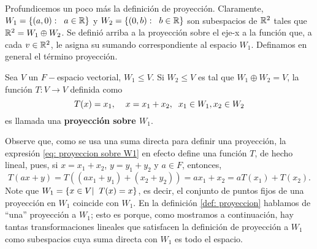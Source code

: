 Profundicemos un poco más la definición de proyección.
Claramente, $W_{1} = \{ (a, 0): \hspace{0.2cm} a \in \mathbb{R} \}$
y $W_{2} = \{ (0, b): \hspace{0.2cm} b \in \mathbb{R} \}$
son subespacios de $\mathbb{R}^{2}$ tales que 
$\mathbb{R}^{2} = W_{1} \oplus W_{2}$. Se definió arriba a la proyección
sobre el eje-x a la función que, a cada $v \in \mathbb{R}^{2}$, le 
asigna su sumando correspondiente al espacio $W_{1}$.
Definamos en general el término proyección.
\begin{defi}
	\label{def: proyeccion}
Sea $V$ un $F-$espacio vectorial, $W_{1} \leq V$.
Si $W_{2} \leq V$ es tal que $W_{1} \oplus W_{2} = V$, 
la función $T: V \longrightarrow V$ definida como
\begin{equation}
	\label{eq: proyeccion sobre W1}
	T(x) = x_{1}, \hspace{0.4cm}
x = x_{1} + x_{2}, \hspace{0.2cm}
x_{1} \in W_{1}, x_{2} \in W_{2}
\end{equation}
es llamada
una \textbf{proyección sobre $W_{1}$}.
\end{defi}
Observe que, como se usa una suma directa para
definir una proyección, la expresión
\eqref{eq: proyeccion sobre W1}
en efecto define una función $T$, de hecho lineal, pues,
si $x = x_{1} + x_{2}$, $y = y_{1} + y_{2}$ y $a \in F$,
entonces,
\[
T(ax + y) = 
T((ax_{1} + y_{1}) + (x_{2}+y_{2}))
= ax_{1} + x_{2} =
a T(x_{1}) + T(x_{2}).
\] 
Note que $W_{1} = \{ x \in V  | \hspace{0.2cm} T(x) = x \}$,
es decir, el conjunto de puntos fijos de una proyección
en $W_{1}$ coincide con $W_{1}$. 
En la definición \ref{def: proyeccion}
hablamos de ``una'' proyección a $W_{1}$; esto es porque, 
como mostramos a continuación, hay tantas
transformaciones lineales que satisfacen la 
definición de proyección
a $W_{1}$ como subespacios cuya suma directa
con $W_{1}$ es todo el espacio.

